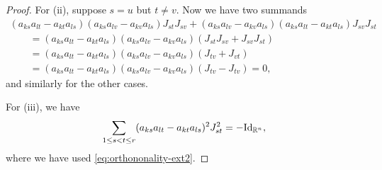 \documentclass[10pt,a4paper]{amsart}
\numberwithin{equation}{section}
\begin{document}
\begin{proof}
For (ii), suppose $s=u$ but $t\not=v$. Now we have two summands
\begin{gather*}
 (a_{k s} a_{l t} - a_{k t} a_{l s}) (a_{k s} a_{l v} - a_{k v} a_{l s}) J_{s t} J_{s v}
 + (a_{k s} a_{l v} - a_{k v} a_{l s}) (a_{k s} a_{l t} - a_{k t} a_{l s}) J_{s v} J_{s t}\\
 \qquad{} = (a_{k s} a_{l t} - a_{k t} a_{l s}) (a_{k s} a_{l v} - a_{k v} a_{l s})
 (J_{s t} J_{s v}+J_{s v} J_{s t}) \\
 \qquad{} = (a_{k s} a_{l t} - a_{k t} a_{l s}) (a_{k s} a_{l v} - a_{k v} a_{l s})
 (J_{tv}+J_{vt}) \\
 \qquad{} = (a_{k s} a_{l t} - a_{k t} a_{l s}) (a_{k s} a_{l v} - a_{k v} a_{l s}) (J_{tv}-J_{tv}) =0,
\end{gather*}
and similarly for the other cases.

For (iii), we have
\begin{gather*}
 \sum_{1\leq s< t\leq r}(a_{ks}a_{lt} -a_{kt}a_{ls})^2 J_{st}^2 = -{\rm Id}_{\mathbb{R}^n},
\end{gather*}
where we have used \eqref{eq:orthononality-ext2}.
\end{proof}
\end{document}
